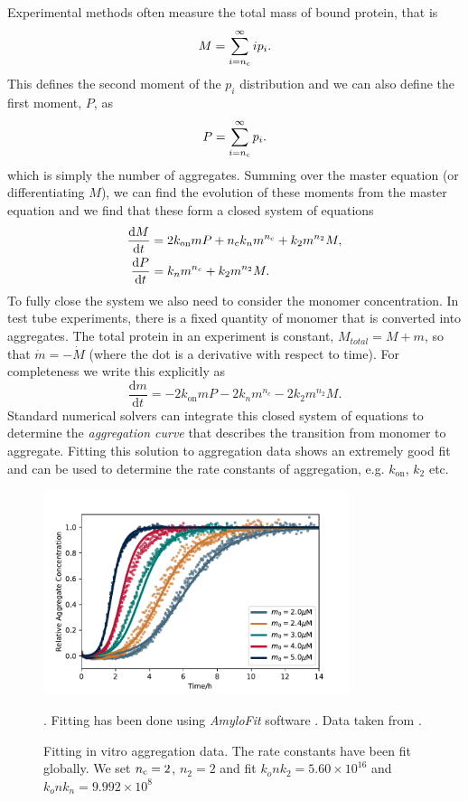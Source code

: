 Experimental methods  often measure the total mass of bound protein, that is
\begin{equation}
    M = \sum_{i=n_{\mathrm{c}}}^{\infty}i p_i.
\end{equation}
This defines the second moment of the $p_i$ distribution and we can also define the first moment, $P$, as 
\begin{equation}
    P = \sum_{i=n_{\mathrm{c}}}^{\infty} p_i.
\end{equation}
which is simply the number of aggregates. Summing over the master equation (or differentiating $M$), we can find the evolution of these moments from the master equation and  we find that these form a closed system of equations
\begin{align}
    \frac{\text{d}M}{\text{d}t} &= 2 k_\text{on}m P + n_{\mathrm{c}} k_n m^{n_{\mathrm{c}}}+ k_2 m^{n_2} M, \label{eq:4-Mvitro} \\
    \frac{\text{d}P}{\text{d}t} &= k_n m^{n_c}+k_2 m^{n_2} M. \label{eq:4-Pvitro}
\end{align}
To fully close the system we also need to consider the monomer concentration. In test tube experiments, there is a fixed quantity of monomer that is converted into aggregates. The total protein in an experiment is constant, $M_{total} = M + m$, so that $\dot{m}=-\dot{M}$ (where the dot is a derivative with respect to time). For completeness we write this explicitly as 
\begin{equation}
    \frac{\text{d}m}{\text{d}t} = -2 k_\text{on}m P - 2k_n m^{n_c} - 2k_2 m^{n_2} M. \label{eq:4-mvitro}
\end{equation}
Standard numerical solvers can integrate this closed system of equations to determine the \textit{aggregation curve} that describes the transition from monomer to aggregate. Fitting this solution to aggregation data shows an extremely good fit and can be used to determine the rate constants of aggregation, e.g. $k_\text{on}$, $k_2$ etc.

\begin{figure}
    \centering
    \includegraphics[width=0.8\textwidth]{figures/4-agg-figs/invitroDemo.pdf}
    \caption{Fitting in vitro aggregation data. The rate constants have been fit globally. We set $n_{\mathrm{c}}=2$, $n_2=2$ and fit $k_on k_2=5.60\times10^{16}$ and $k_on k_n=9.992\times10^{8}$}. Fitting has been done using \textit{AmyloFit} software \cite{meisl_molecular_2016}. Data taken from \cite{cohen_proliferation_2013}.
    \label{fig:4-invitro}
\end{figure}


